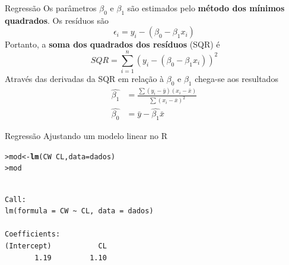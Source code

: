 \documentclass[10pt]{beamer}\usepackage{graphicx, color}
\makeatletter
\newcommand{\hlfunctioncall}[1]{\textcolor[rgb]{0,0,0.545098039215686}{\textbf{#1}}}%
\newenvironment{kframe}{%
 \def\at@end@of@kframe{}%
 \ifinner\ifhmode%
  \def\at@end@of@kframe{\end{minipage}}%
  \begin{minipage}{\columnwidth}%
 \fi\fi%
 \def\FrameCommand##1{\hskip\@totalleftmargin \hskip-\fboxsep
 \colorbox{shadecolor}{##1}\hskip-\fboxsep
     \hskip-\linewidth \hskip-\@totalleftmargin \hskip\columnwidth}%
 \MakeFramed {\advance\hsize-\width
   \@totalleftmargin\z@ \linewidth\hsize
   \@setminipage}}%
 {\par\unskip\endMakeFramed%
 \at@end@of@kframe}
\newenvironment{knitrout}{}{} %
\providecommand{\R}{\textsf{R}\xspace}
\makeatother
\begin{document}
\begin{frame}[fragile=singleslide]{Regressão}
Os parâmetros $\beta_0$ e $\beta_1$ são estimados pelo \textbf{método dos
mínimos quadrados}. Os resíduos são
\begin{equation*}
  \epsilon_i = y_i - (\beta_0 - \beta_1 x_i)
\end{equation*}
Portanto, a \textbf{soma dos quadrados dos resíduos} (SQR) é
\begin{equation*}
  SQR = \sum_{i=1}^{n} (y_i - (\beta_0 - \beta_1 x_i))^2
\end{equation*}
Através das derivadas da SQR em relação à $\beta_0$ e $\beta_1$ chega-se
aos resultados
\begin{align*}
  \hat{\beta_1} &= \frac{\sum (y_i - \bar{y}) (x_i - \bar{x})}
  {\sum (x_i - \bar{x})^2} \\
  \hat{\beta_0} &= \bar{y} - \hat{\beta_1} \bar{x}
\end{align*}
\end{frame}

\begin{frame}[fragile=singleslide]{Regressão}
Ajustando um modelo linear no \R
\begin{knitrout}\small
{}\color{fgcolor}\begin{kframe}
\begin{alltt}
> mod <- \hlfunctioncall{lm}(CW ~ CL, data = dados)
> mod
\end{alltt}
\begin{verbatim}

Call:
lm(formula = CW ~ CL, data = dados)

Coefficients:
(Intercept)           CL  
       1.19         1.10  

\end{verbatim}
\end{kframe}
\end{knitrout}

\end{frame}
\end{document}
